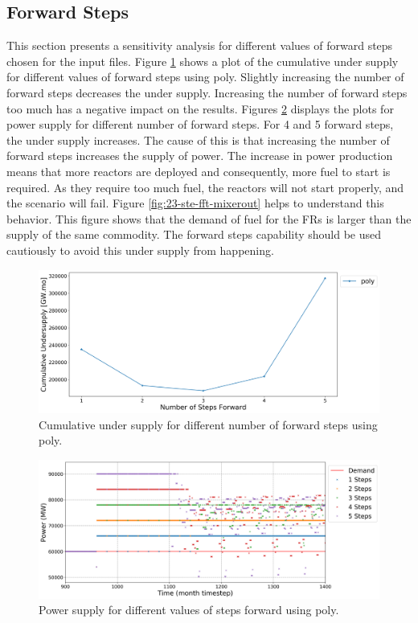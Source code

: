 \documentclass[11pt]{article}
\begin{document}
\subsection{Forward Steps}

This section presents a sensitivity analysis for different values of forward steps chosen for the input files.
Figure \ref{fig:23-steps} shows a plot of the cumulative under supply for different values of forward steps using poly.
Slightly increasing the number of forward steps decreases the under supply. Increasing the number of forward steps too much has a negative impact on the results.
Figures \ref{fig:23-ste-poly} displays the plots for power supply for different number of forward steps. For 4 and 5 forward steps, the under supply increases.
The cause of this is that increasing the number of forward steps increases the supply of power. The increase in power production means that more reactors are deployed and consequently, more fuel to start is required. As they require too much fuel, the reactors will not start properly, and the scenario will fail. Figure \ref{fig:23-ste-fft-mixerout} helps to understand this behavior. This figure shows that the demand of fuel for the FRs is larger than the supply of the same commodity.
The forward steps capability should be used cautiously to avoid this under supply from happening.

\begin{figure}[H]
	\centering
	\includegraphics[width=\textwidth]{23-figures/23-sens-steps.png} 
	\hfill
	\caption{Cumulative under supply for different number of forward steps using poly.}
	\label{fig:23-steps}
\end{figure}

\begin{figure}[H]
	\centering
	\includegraphics[width=\textwidth]{23-figures/23-power-buffer0-poly-steps.png} 
	\hfill
	\caption{Power supply for different values of steps forward using poly.}
	\label{fig:23-ste-poly}
\end{figure}
\end{document}
